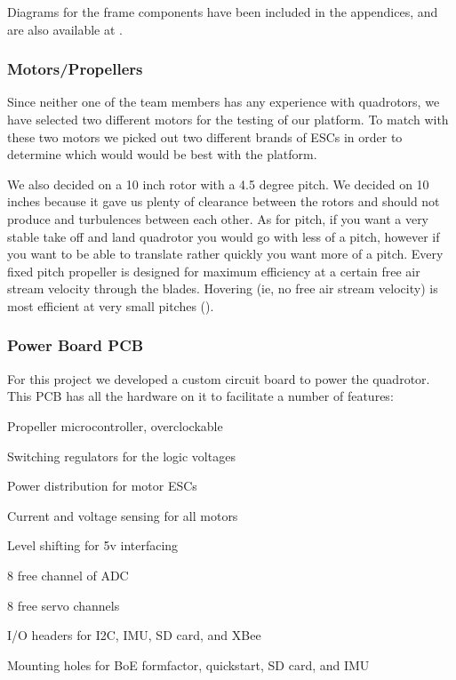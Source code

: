 \documentclass{article}
\numberwithin{equation}{section} %
\begin{document}
Diagrams for the frame components have been included in the appendices, and are also available at \cite{anzhelka_code}.

\subsubsection{Motors/Propellers}

Since neither one of the team members has any experience with quadrotors, we have selected two different motors for the testing of our platform. To match with these two motors we picked out two different brands of ESCs in order to determine which would would be best with the platform.

We also decided on a 10 inch rotor with a 4.5 degree pitch. We decided on 10 inches because it gave us plenty of clearance between the rotors and should not produce and turbulences between each other. As for pitch, if you want a very stable take off and land quadrotor you would go with less of a pitch, however if you want to be able to translate rather quickly you want more of a pitch. Every fixed pitch propeller is designed for maximum efficiency at a certain free air stream velocity through the blades. Hovering (ie, no free air stream velocity) is most efficient at very small pitches (\cite{propeller_pitch}).


\subsubsection{Power Board PCB}
For this project we developed a custom circuit board to power the quadrotor. This PCB has all the hardware on it to facilitate a number of features:
\begin{list}{*}{}
	\item Propeller microcontroller, overclockable
	\item Switching regulators for the logic voltages
	\item Power distribution for motor ESCs
	\item Current and voltage sensing for all motors
	\item Level shifting for 5v interfacing
	\item 8 free channel of ADC
	\item 8 free servo channels
	\item I/O headers for I2C, IMU, SD card, and XBee
	\item Mounting holes for BoE formfactor, quickstart, SD card, and IMU
\end{list}
\end{document}
